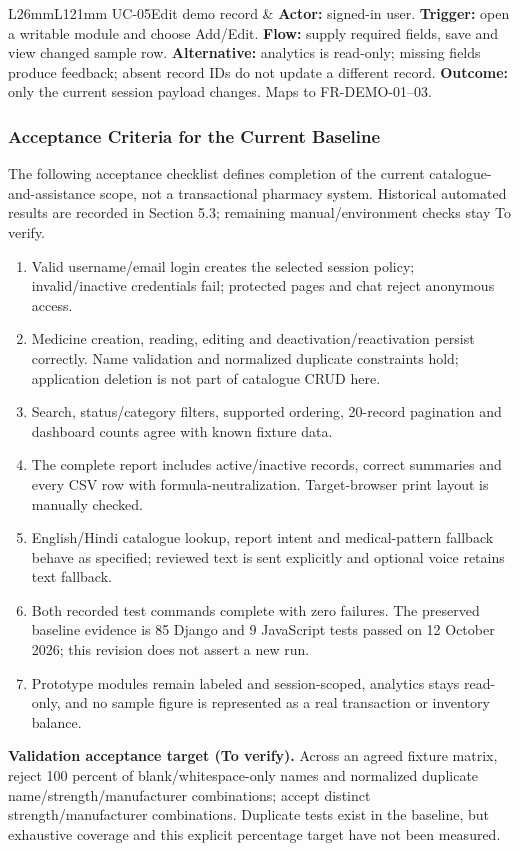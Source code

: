 \documentclass[11pt,a4paper]{article}
\begin{document}
\begin{longtable}{L{26mm}L{121mm}}
UC-05\newline Edit demo record & \textbf{Actor:} signed-in user. \textbf{Trigger:} open a writable module and choose Add/Edit. \textbf{Flow:} supply required fields, save and view changed sample row. \textbf{Alternative:} analytics is read-only; missing fields produce feedback; absent record IDs do not update a different record. \textbf{Outcome:} only the current session payload changes. Maps to FR-DEMO-01--03.\\
\end{longtable}

\subsubsection{Acceptance Criteria for the Current Baseline}
The following acceptance checklist defines completion of the current catalogue-and-assistance scope, not a transactional pharmacy system. Historical automated results are recorded in Section 5.3; remaining manual/environment checks stay To verify.
\begin{enumerate}
\item Valid username/email login creates the selected session policy; invalid/inactive credentials fail; protected pages and chat reject anonymous access.
\item Medicine creation, reading, editing and deactivation/reactivation persist correctly. Name validation and normalized duplicate constraints hold; application deletion is not part of catalogue CRUD here.
\item Search, status/category filters, supported ordering, 20-record pagination and dashboard counts agree with known fixture data.
\item The complete report includes active/inactive records, correct summaries and every CSV row with formula-neutralization. Target-browser print layout is manually checked.
\item English/Hindi catalogue lookup, report intent and medical-pattern fallback behave as specified; reviewed text is sent explicitly and optional voice retains text fallback.
\item Both recorded test commands complete with zero failures. The preserved baseline evidence is 85 Django and 9 JavaScript tests passed on 12 October 2026; this revision does not assert a new run.
\item Prototype modules remain labeled and session-scoped, analytics stays read-only, and no sample figure is represented as a real transaction or inventory balance.
\end{enumerate}
\textbf{Validation acceptance target (To verify).} Across an agreed fixture matrix, reject 100 percent of blank/whitespace-only names and normalized duplicate name/strength/manufacturer combinations; accept distinct strength/manufacturer combinations. Duplicate tests exist in the baseline, but exhaustive coverage and this explicit percentage target have not been measured.
\end{document}
